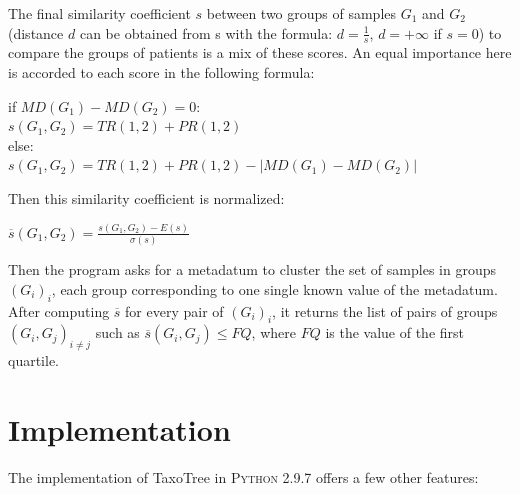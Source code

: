 \documentclass{report}
\begin{document}
The final similarity coefficient $s$ between two groups of samples $G_{1}$ and $G_{2}$ (distance $d$ can be obtained from s with the formula: $d = \frac{1}{s}$, $d = +\infty$ if $s = 0$) to compare the groups of patients is a mix of these scores. An equal importance here is accorded to each score in the following formula:\\

\begin{center}
if $MD(G_{1}) - MD(G_{2}) = 0$:\\
$s(G_{1},G_{2}) = TR(1,2) + PR(1,2)$\\

else:\\
$s(G_{1},G_{2}) = TR(1,2) + PR(1,2) - | MD(G_{1}) - MD(G_{2}) |$\\
\end{center}

Then this similarity coefficient is normalized:\\
\begin{center}
$\overline{s}(G_{1},G_{2}) = \frac{s(G_{1},G_{2}) - E(s)}{\sigma(s)}$\\
\end{center}

Then the program asks for a metadatum to cluster the set of samples in groups $(G_{i})_{i}$, each group corresponding to one single known value of the metadatum. After computing $\overline{s}$ for every pair of $(G_{i})_{i}$, it returns the list of pairs of groups $(G_{i},G_{j})_{i \neq j}$ such as $\overline{s}(G_{i},G_{j}) \le FQ$, where $FQ$ is the value of the first quartile. 

\section{Implementation}

The implementation of TaxoTree in \textsc{Python 2.9.7} offers a few other features:
\end{document}
